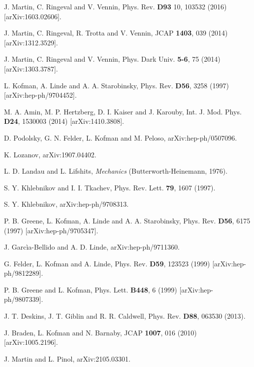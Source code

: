 \documentclass[11pt,a4paper,twoside]{book}
\begin{document}
\begin{thebibliography}{2}
	 J. Martin, C. Ringeval and V. Vennin, Phys. Rev. \textbf{D93} 10, 103532 (2016) [arXiv:1603.02606].
	
	 J. Martin, C. Ringeval, R. Trotta and V. Vennin, JCAP \textbf{1403}, 039 (2014) [arXiv:1312.3529].
	
	 J. Martin, C. Ringeval and V. Vennin, Phys. Dark Univ. \textbf{5-6}, 75 (2014) [arXiv:1303.3787].
	
	 L. Kofman, A. Linde and A. A. Starobinsky, Phys. Rev. \textbf{D56}, 3258 (1997) [arXiv:hep-ph/9704452].
	
	 M. A. Amin, M. P. Hertzberg, D. I. Kaiser and J. Karouby, Int. J.  Mod. Phys. \textbf{D24}, 1530003 (2014) [arXiv:1410.3808].
	
	 D. Podolsky, G. N. Felder, L. Kofman and M. Peloso,  arXiv:hep-ph/0507096.
	
	 K. Lozanov, arXiv:1907.04402.
	
	 L. D. Landau and L. Lifshits, \textit{Mechanics} (Butterworth-Heinemann, 1976).
	
	 S. Y. Khlebnikov and I. I. Tkachev, Phys. Rev. Lett. \textbf{79}, 1607 (1997).
	
	 S. Y. Khlebnikov, arXiv:hep-ph/9708313.
	
	 P. B. Greene, L. Kofman, A. Linde and A. A. Starobinsky, Phys. Rev. \textbf{D56}, 6175 (1997) [arXiv:hep-ph/9705347].
	
	 J. Garcìa-Bellido and A. D. Linde, arXiv:hep-ph/9711360.
	
	 G. Felder, L. Kofman and A. Linde, Phys. Rev. \textbf{D59}, 123523 (1999) [arXiv:hep-ph/9812289].
	
	 P. B. Greene and L. Kofman, Phys. Lett. \textbf{B448}, 6 (1999) [arXiv:hep-ph/9807339].
	
	 J. T. Deskins, J. T. Giblin and R. R. Caldwell, Phys. Rev. \textbf{D88}, 063530 (2013).
	
	 J. Braden, L. Kofman and N. Barnaby, JCAP \textbf{1007}, 016 (2010) [arXiv:1005.2196].
	
	 J. Martin and L. Pinol, arXiv:2105.03301.
	

\end{thebibliography}
\end{document}
